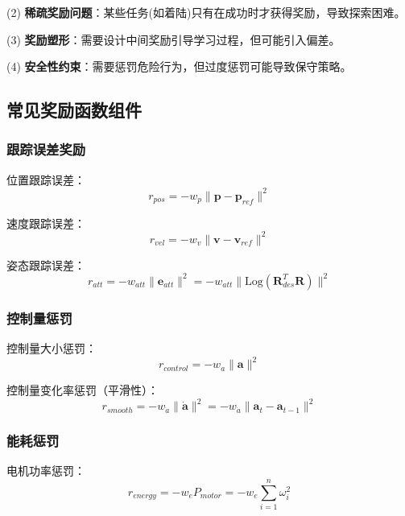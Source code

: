 \documentclass[12pt,a4paper]{ctexart}
\begin{document}
(2) \textbf{稀疏奖励问题}：某些任务(如着陆)只有在成功时才获得奖励，导致探索困难。

(3) \textbf{奖励塑形}：需要设计中间奖励引导学习过程，但可能引入偏差。

(4) \textbf{安全性约束}：需要惩罚危险行为，但过度惩罚可能导致保守策略。

\subsection{常见奖励函数组件}

\subsubsection{跟踪误差奖励}

位置跟踪误差：
\begin{equation}
r_{pos} = -w_p\|\mathbf{p} - \mathbf{p}_{ref}\|^2
\end{equation}

速度跟踪误差：
\begin{equation}
r_{vel} = -w_v\|\mathbf{v} - \mathbf{v}_{ref}\|^2
\end{equation}

姿态跟踪误差：
\begin{equation}
r_{att} = -w_{att}\|\mathbf{e}_{att}\|^2 = -w_{att}\|\text{Log}(\mathbf{R}_{des}^T \mathbf{R})\|^2
\end{equation}

\subsubsection{控制量惩罚}

控制量大小惩罚：
\begin{equation}
r_{control} = -w_a\|\mathbf{a}\|^2
\end{equation}

控制量变化率惩罚（平滑性）：
\begin{equation}
r_{smooth} = -w_{\dot{a}}\|\dot{\mathbf{a}}\|^2 = -w_{\dot{a}}\|\mathbf{a}_t - \mathbf{a}_{t-1}\|^2
\end{equation}

\subsubsection{能耗惩罚}

电机功率惩罚：
\begin{equation}
r_{energy} = -w_e P_{motor} = -w_e \sum_{i=1}^{n} \omega_i^2
\end{equation}
\end{document}
